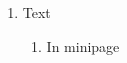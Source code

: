 \documentclass{article}
\begin{document}
\begin{enumerate}
\item Text
  \begin{minipage}[t]{5cm}
    \begin{enumerate} \item In minipage \end{enumerate}
  \end{minipage}
  
\end{enumerate}
\end{document}
